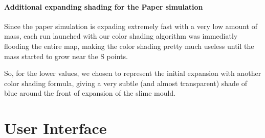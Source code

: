 \paragraph{Additional expanding shading for the Paper simulation}

Since the paper simulation is expading extremely fast with a very low amount of mass, each run launched with our color shading algorithm was immediatly flooding the entire map, making the color shading pretty much useless until the mass started to grow near the S points.

So, for the lower values, we chosen to represent the initial expansion with another color shading formula, giving a very subtle (and almost transparent) shade of blue around the front of expansion of the slime mould.

\section{User Interface}
